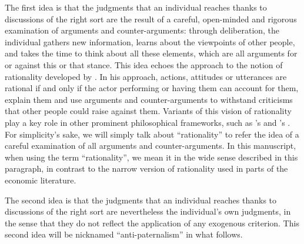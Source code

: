 \documentclass[version=3.21, pagesize, twoside=off, bibliography=totoc, DIV=calc, fontsize=12pt, a4paper, french, english]{scrartcl}
\begin{document}
The first idea is that the judgments that an individual reaches thanks to discussions of the right sort are the result of a careful, open-minded and rigorous examination of arguments and counter-arguments: through deliberation, the individual gathers new information, learns about the viewpoints of other people, and takes the time to think about all these elements, 
which are all arguments for or against this or that stance. 
This idea echoes the approach to the notion of rationality developed by \citet{habermas_theorie_1981}.
In his approach, actions, attitudes or utterances are rational if and only if the actor performing or having them can account for them, explain them and use arguments and counter-arguments to withstand criticisms that other people could raise against them. 
Variants of this vision of rationality play a key role in other prominent philosophical frameworks, such as \citeauthor{scanlon_what_2000}’s \citeyearpar{scanlon_what_2000} and \citeauthor{sen_idea_2009}’s \citeyearpar{sen_idea_2009}. 
For simplicity’s sake, we will simply talk about “rationality” to refer the idea of a careful examination of all arguments and counter-arguments.
In this manuscript, when using the term “rationality”, we mean it in the wide sense described in this paragraph, in contrast to the narrow version of rationality used in parts of the economic literature.

The second idea is that the judgments that an individual reaches thanks to discussions of the right sort are nevertheless the individual’s own judgments, in the sense that they do not reflect the application of any exogenous criterion. 
This second idea will be nicknamed “anti-paternalism” in what follows.

\end{document}

